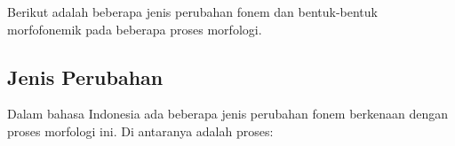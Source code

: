 Berikut adalah beberapa jenis perubahan fonem dan bentuk-bentuk morfofonemik pada beberapa proses morfologi.






\subsection{Jenis Perubahan}
\label{sec:jenisPerubahan}

Dalam bahasa Indonesia ada beberapa jenis perubahan fonem berkenaan dengan proses morfologi ini. Di antaranya adalah proses:

